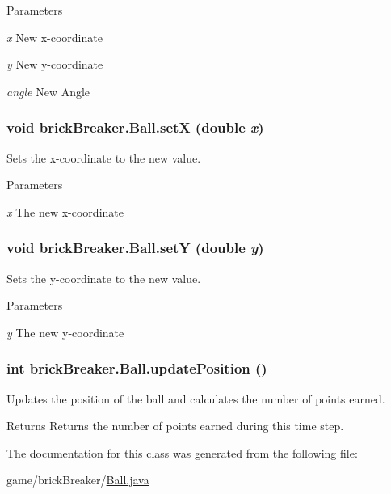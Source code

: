\begin{DoxyParams}{Parameters}
\item[{\em x}]New x-\/coordinate \item[{\em y}]New y-\/coordinate \item[{\em angle}]New Angle \end{DoxyParams}
\hypertarget{classbrick_breaker_1_1_ball_a71e24748f9cb90bd9da6a910648ba84e}{
\subsubsection[{setX}]{\setlength{\rightskip}{0pt plus 5cm}void brickBreaker.Ball.setX (double {\em x})}}
\label{classbrick_breaker_1_1_ball_a71e24748f9cb90bd9da6a910648ba84e}
Sets the x-\/coordinate to the new value. 
\begin{DoxyParams}{Parameters}
\item[{\em x}]The new x-\/coordinate \end{DoxyParams}
\hypertarget{classbrick_breaker_1_1_ball_ae15aedc6cd01476f486328369fd6a799}{
\subsubsection[{setY}]{\setlength{\rightskip}{0pt plus 5cm}void brickBreaker.Ball.setY (double {\em y})}}
\label{classbrick_breaker_1_1_ball_ae15aedc6cd01476f486328369fd6a799}
Sets the y-\/coordinate to the new value. 
\begin{DoxyParams}{Parameters}
\item[{\em y}]The new y-\/coordinate \end{DoxyParams}
\hypertarget{classbrick_breaker_1_1_ball_a7c119360e2434ef5c69020e8608569ff}{
\subsubsection[{updatePosition}]{\setlength{\rightskip}{0pt plus 5cm}int brickBreaker.Ball.updatePosition ()}}
\label{classbrick_breaker_1_1_ball_a7c119360e2434ef5c69020e8608569ff}
Updates the position of the ball and calculates the number of points earned.

\begin{DoxyReturn}{Returns}
Returns the number of points earned during this time step. 
\end{DoxyReturn}


The documentation for this class was generated from the following file:\begin{DoxyCompactItemize}
\item 
game/brickBreaker/\hyperlink{_ball_8java}{Ball.java}\end{DoxyCompactItemize}
